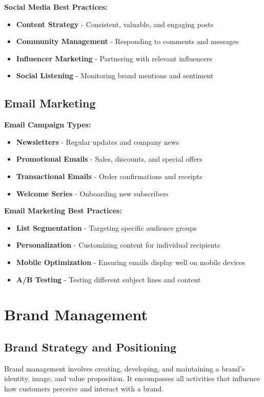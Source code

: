 \documentclass[12pt]{article}
\begin{document}
\textbf{Social Media Best Practices:}
\begin{itemize}
    \item \textbf{Content Strategy} - Consistent, valuable, and engaging posts
    \item \textbf{Community Management} - Responding to comments and messages
    \item \textbf{Influencer Marketing} - Partnering with relevant influencers
    \item \textbf{Social Listening} - Monitoring brand mentions and sentiment
\end{itemize}

\subsection{Email Marketing}

\textbf{Email Campaign Types:}
\begin{itemize}
    \item \textbf{Newsletters} - Regular updates and company news
    \item \textbf{Promotional Emails} - Sales, discounts, and special offers
    \item \textbf{Transactional Emails} - Order confirmations and receipts
    \item \textbf{Welcome Series} - Onboarding new subscribers
\end{itemize}

\textbf{Email Marketing Best Practices:}
\begin{itemize}
    \item \textbf{List Segmentation} - Targeting specific audience groups
    \item \textbf{Personalization} - Customizing content for individual recipients
    \item \textbf{Mobile Optimization} - Ensuring emails display well on mobile devices
    \item \textbf{A/B Testing} - Testing different subject lines and content
\end{itemize}

\section{Brand Management}

\subsection{Brand Strategy and Positioning}
Brand management involves creating, developing, and maintaining a brand's identity, image, and value proposition. It encompasses all activities that influence how customers perceive and interact with a brand.
\end{document}
